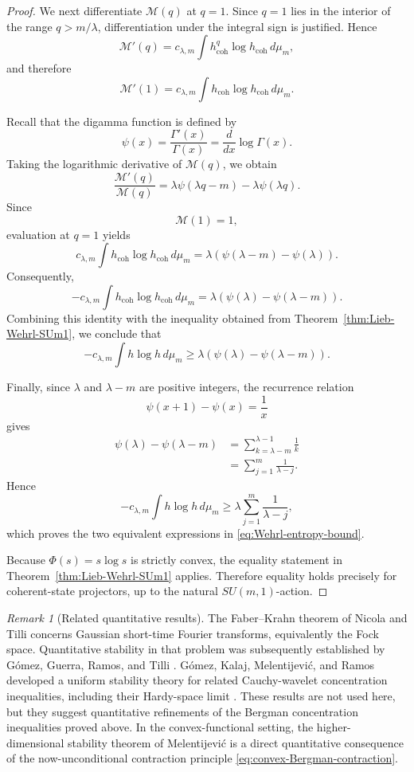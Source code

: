 \documentclass[11pt,reqno]{amsart}
\numberwithin{equation}{section}
\theoremstyle{definition}
\theoremstyle{remark}
\newtheorem{remark}[theorem]{Remark}
\begin{document}
\begin{proof}
We next differentiate \(\mathcal M(q)\) at \(q=1\). Since
\(q=1\) lies in the interior of the range \(q>m/\lambda\),
differentiation under the integral sign is justified. Hence
\[
\mathcal M'(q)
=
c_{\lambda,m}
\int
h_{\mathrm{coh}}^q
\log h_{\mathrm{coh}}\,d\mu_m,
\]
and therefore
\[
\mathcal M'(1)
=
c_{\lambda,m}
\int
h_{\mathrm{coh}}
\log h_{\mathrm{coh}}\,d\mu_m.
\]

Recall that the digamma function is defined by
\[
\psi(x)
=
\frac{\Gamma'(x)}{\Gamma(x)}
=
\frac{d}{dx}\log\Gamma(x).
\]
Taking the logarithmic derivative of \(\mathcal M(q)\), we obtain
\[
\frac{\mathcal M'(q)}{\mathcal M(q)}
=
\lambda\psi(\lambda q-m)
-
\lambda\psi(\lambda q).
\]
Since
\[
\mathcal M(1)=1,
\]
evaluation at \(q=1\) yields
\[
c_{\lambda,m}
\int
h_{\mathrm{coh}}
\log h_{\mathrm{coh}}\,d\mu_m
=
\lambda
\left(
\psi(\lambda-m)-\psi(\lambda)
\right).
\]
Consequently,
\[
-c_{\lambda,m}
\int
h_{\mathrm{coh}}
\log h_{\mathrm{coh}}\,d\mu_m
=
\lambda
\left(
\psi(\lambda)-\psi(\lambda-m)
\right).
\]
Combining this identity with the inequality obtained from
Theorem~\ref{thm:Lieb-Wehrl-SUm1}, we conclude that
\[
-c_{\lambda,m}
\int h\log h\,d\mu_m
\geq
\lambda
\left(
\psi(\lambda)-\psi(\lambda-m)
\right).
\]

Finally, since \(\lambda\) and \(\lambda-m\) are positive integers, the
recurrence relation
\[
\psi(x+1)-\psi(x)
=
\frac{1}{x}
\]
gives
\[
\begin{aligned}
\psi(\lambda)-\psi(\lambda-m)
&=
\sum_{k=\lambda-m}^{\lambda-1}\frac{1}{k} \\
&=
\sum_{j=1}^{m}\frac{1}{\lambda-j}.
\end{aligned}
\]
Hence
\[
-c_{\lambda,m}
\int h\log h\,d\mu_m
\geq
\lambda
\sum_{j=1}^{m}\frac{1}{\lambda-j},
\]
which proves the two equivalent expressions in
\eqref{eq:Wehrl-entropy-bound}.

Because \(\Phi(s)=s\log s\) is strictly convex, the equality statement in
Theorem~\ref{thm:Lieb-Wehrl-SUm1} applies. Therefore equality holds
precisely for coherent-state projectors, up to the natural
\(SU(m,1)\)-action.
\end{proof}
\begin{remark}[Related quantitative results]
The Faber--Krahn theorem of Nicola and Tilli \cite{NicolaTilli2022}
concerns Gaussian short-time Fourier transforms, equivalently the Fock
space. Quantitative stability in that problem was subsequently established
by G\'omez, Guerra, Ramos, and Tilli
\cite{GomezGuerraRamosTilli2024}. G\'omez, Kalaj, Melentijevi\'c, and Ramos
developed a uniform stability theory for related Cauchy-wavelet
concentration inequalities, including their Hardy-space limit
\cite{GomezKalajMelentijevicRamos2025}. These results are not used here, but
they suggest quantitative refinements of the Bergman concentration
inequalities proved above.  In the convex-functional setting, the
higher-dimensional stability theorem of Melentijevi\'c
\cite[Theorem~4]{Melentijevic2025} is a direct quantitative consequence of
the now-unconditional contraction principle
\eqref{eq:convex-Bergman-contraction}.
\end{remark}
\end{document}

